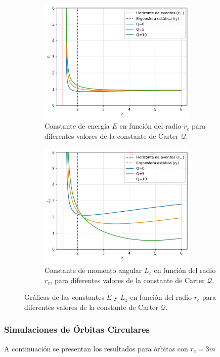 \begin{figure}[H]
    \begin{subfigure}{0.5\textwidth}
        \includegraphics[width=0.9\linewidth, height=6cm]{AgujerosNegros/kerr/geodesics_plots/circular_orbits_E_vs_r.png}
        \caption{Constante de energía $E$ en función del radio $r_c$ para diferentes valores de la constante de Carter $\mathcal{Q}$.}
    \end{subfigure}
    \begin{subfigure}{0.5\textwidth}
        \includegraphics[width=0.9\linewidth, height=6cm]{AgujerosNegros/kerr/geodesics_plots/circular_orbits_Lz_vs_r.png}
        \caption{Constante de momento angular $L_z$ en función del radio $r_c$, para diferentes valores de la constante de Carter $\mathcal{Q}$.}
    \end{subfigure}
    \caption{Gráficas de las constantes $E$ y $L_z$ en función del radio $r_c$ para diferentes valores de la constante de Carter $\mathcal{Q}$.}
\end{figure}

\subsubsection{Simulaciones de Órbitas Circulares }
A continuación se presentan los resultados para  órbitas con $r_c = 3m$

